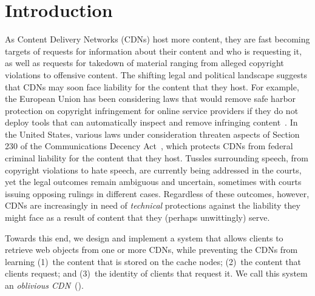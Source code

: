 \section{Introduction}
\label{sec:intro}


As Content Delivery Networks (CDNs) host more content,
they are fast becoming targets of requests for information about their content
and who is requesting it, as well as requests for takedown of material ranging
from alleged copyright violations to offensive content. The shifting legal and
political landscape suggests that CDNs may soon face liability for the content
that they host. For example, the European Union has been considering laws that
would remove safe harbor protection on copyright infringement for online
service providers if they do not deploy tools that can automatically inspect
and remove infringing content~\cite{eu-copyright}. In the United States,
various laws under consideration threaten aspects of Section 230 of the
Communications Decency Act~\cite{sec230}, which protects CDNs from federal
criminal liability for the content that they host. Tussles surrounding speech,
from copyright violations to hate speech, are currently being addressed in the
courts, yet the legal outcomes remain ambiguous and uncertain, sometimes with
courts issuing opposing rulings in different cases. Regardless of these
outcomes, however, CDNs are increasingly in need of {\em technical}
protections against the liability they might face as a result of content that
they (perhaps unwittingly) serve.

Towards this end, we design and implement a system that allows clients to
retrieve web objects from one or more CDNs, while preventing the CDNs from
learning (1)~the content that is stored on the cache nodes; (2)~the content
that clients request; and (3)~the identity of clients that request it. We call this system an {\em oblivious CDN}~(\system{}).%

